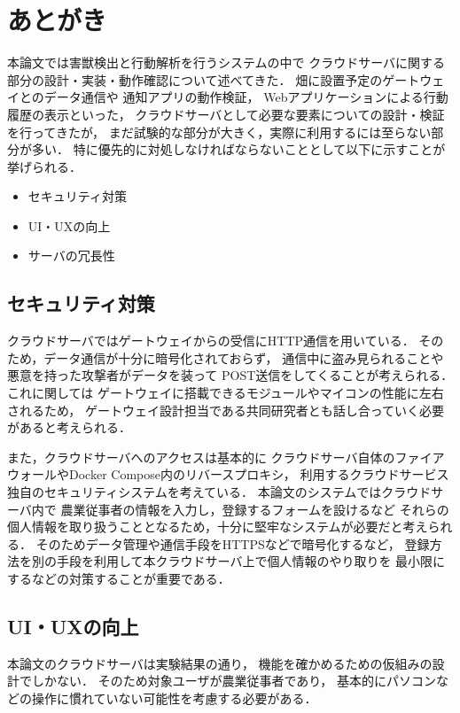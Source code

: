 \documentclass[12pt]{honka_v1}
\begin{document}
\fi
\section{あとがき}

本論文では害獣検出と行動解析を行うシステムの中で
クラウドサーバに関する部分の設計・実装・動作確認について述べてきた．
畑に設置予定のゲートウェイとのデータ通信や
通知アプリの動作検証，
Webアプリケーションによる行動履歴の表示といった，
クラウドサーバとして必要な要素についての設計・検証を行ってきたが，
まだ試験的な部分が大きく，実際に利用するには至らない部分が多い．
特に優先的に対処しなければならないこととして以下に示すことが挙げられる．
\begin{itemize}
    \item セキュリティ対策
    \item UI・UXの向上
    \item サーバの冗長性
\end{itemize}

\subsection{セキュリティ対策}
クラウドサーバではゲートウェイからの受信にHTTP通信を用いている．
そのため，データ通信が十分に暗号化されておらず，
通信中に盗み見られることや悪意を持った攻撃者がデータを装って
POST送信をしてくることが考えられる．
これに関しては
ゲートウェイに搭載できるモジュールやマイコンの性能に左右されるため，
ゲートウェイ設計担当である共同研究者とも話し合っていく必要があると考えられる．

また，クラウドサーバへのアクセスは基本的に
クラウドサーバ自体のファイアウォールやDocker Compose内のリバースプロキシ，
利用するクラウドサービス独自のセキュリティシステムを考えている．
本論文のシステムではクラウドサーバ内で
農業従事者の情報を入力し，登録するフォームを設けるなど
それらの個人情報を取り扱うこととなるため，十分に堅牢なシステムが必要だと考えられる．
そのためデータ管理や通信手段をHTTPSなどで暗号化するなど，
登録方法を別の手段を利用して本クラウドサーバ上で個人情報のやり取りを
最小限にするなどの対策することが重要である．

\subsection{UI・UXの向上}
本論文のクラウドサーバは実験結果の通り，
機能を確かめるための仮組みの設計でしかない．
そのため対象ユーザが農業従事者であり，
基本的にパソコンなどの操作に慣れていない可能性を考慮する必要がある．
\end{document}
